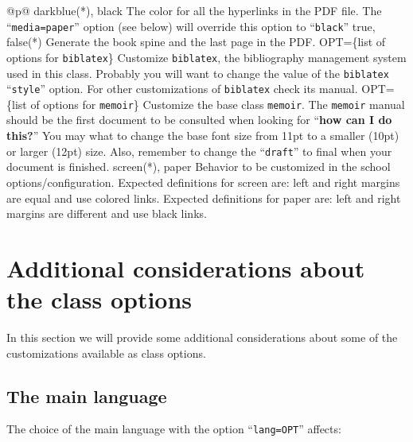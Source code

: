 \begin{ctabular}{@{}p{\linewidth}@{}}
    {darkblue(*), black}%
    {The color for all the hyperlinks in the PDF file.  The “\texttt{media=paper}” option (see below) will override this option to “\texttt{black}”}
    \midrule
    {true, false(*)}%
    {Generate the book spine and the last page in the PDF.}
    \midrule
    {OPT=\{list of options for \texttt{biblatex}\}}%
    {Customize \texttt{biblatex}, the bibliography management system used in this class. Probably you will want to change the value of the \texttt{biblatex} “\texttt{style}” option. For other customizations of \texttt{biblatex} check its manual.}
    \midrule
    {OPT=\{list of options for \texttt{memoir}\}}%
    {Customize the base class \texttt{memoir}. The \texttt{memoir} manual should be the first document to be consulted when looking for “\textbf{how can I do this?}” You may what to change the base font size from 11pt to a smaller (10pt) or larger (12pt) size.  Also, remember to change the “\texttt{draft}” to final when your document is finished.}
    \midrule
    {screen(*), paper}%
    {Behavior to be customized in the school options/configuration. Expected definitions for screen are: left and right margins are equal and use colored links. Expected definitions for paper are: left and right margins are different and use black links.}
    \bottomrule
\end{ctabular}

\section{Additional considerations about the class options}
\label{sec:additional_considerations}

In this section we will provide some additional considerations about some of the customizations available as class options.

\subsection{The main language}
\label{sub:the_main_language}

The choice of the main language with the option “\texttt{lang=OPT}” affects:

